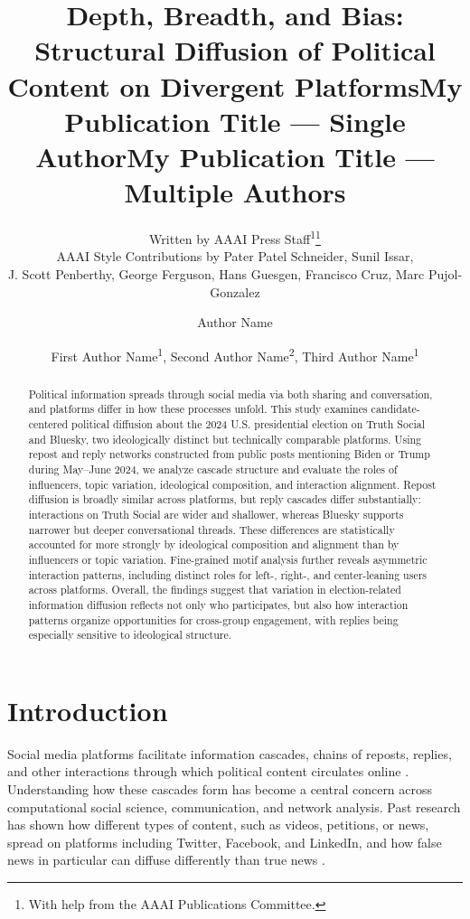 \documentclass[letterpaper]{article} %
\title{Depth, Breadth, and Bias: Structural Diffusion of Political Content on Divergent Platforms}
\author{
    Written by AAAI Press Staff\textsuperscript{\rm 1}\thanks{With help from the AAAI Publications Committee.}\\
    AAAI Style Contributions by Pater Patel Schneider,
    Sunil Issar,\\
    J. Scott Penberthy,
    George Ferguson,
    Hans Guesgen,
    Francisco Cruz\equalcontrib,
    Marc Pujol-Gonzalez\equalcontrib
}
\title{My Publication Title --- Single Author}
\author {
    Author Name
}
\title{My Publication Title --- Multiple Authors}
\author {
    First Author Name\textsuperscript{\rm 1},
    Second Author Name\textsuperscript{\rm 2},
    Third Author Name\textsuperscript{\rm 1}
}
\begin{document}
 

\maketitle

\begin{abstract} 
Political information spreads through social media via both sharing and conversation, and platforms differ in how these processes unfold. This study examines candidate-centered political diffusion about the 2024 U.S. presidential election on Truth Social and Bluesky, two ideologically distinct but technically comparable platforms. Using repost and reply networks constructed from public posts mentioning Biden or Trump during May--June 2024, we analyze cascade structure and evaluate the roles of influencers, topic variation, ideological composition, and interaction alignment. Repost diffusion is broadly similar across platforms, but reply cascades differ substantially: interactions on Truth Social are wider and shallower, whereas Bluesky supports narrower but deeper conversational threads. These differences are statistically accounted for more strongly by ideological composition and alignment than by influencers or topic variation. Fine-grained motif analysis further reveals asymmetric interaction patterns, including distinct roles for left-, right-, and center-leaning users across platforms. Overall, the findings suggest that variation in election-related information diffusion reflects not only who participates, but also how interaction patterns organize opportunities for cross-group engagement, with replies being especially sensitive to ideological structure.
\end{abstract}


\section{Introduction}
Social media platforms facilitate information cascades, chains of reposts, replies, and other interactions through which political content circulates online \cite{easley_networks_2010, gruhl_information_2004, guille_information_2013}. Understanding how these cascades form has become a central concern across computational social science, communication, and network analysis. Past research has shown how different types of content, such as videos, petitions, or news, spread on platforms including Twitter, Facebook, and LinkedIn, and how false news in particular can diffuse differently than true news \cite{goel_structural_2016, cheng_can_2014, anderson_global_2015, vosoughi_spread_2018, zhao_fake_2020}.
\end{document}
